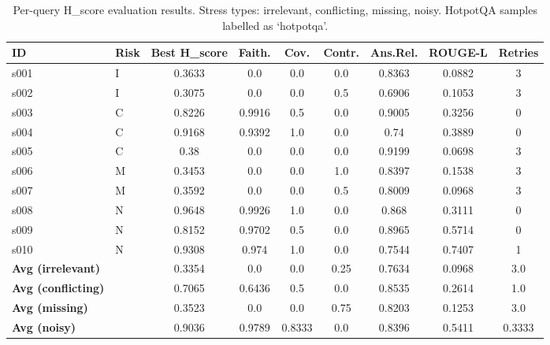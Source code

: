 \begin{table}[h]
\centering
\caption{Per-query H\_score evaluation results. Stress types: irrelevant, conflicting, missing, noisy. HotpotQA samples labelled as `hotpotqa'.}
\label{tab:hscore_results}
\begin{tabular}{llccccccc}
\hline
\textbf{ID} & \textbf{Risk} & \textbf{Best H\_score} & \textbf{Faith.} & \textbf{Cov.} & \textbf{Contr.} & \textbf{Ans.Rel.} & \textbf{ROUGE-L} & \textbf{Retries} \\
\hline
s001 & I & 0.3633 & 0.0 & 0.0 & 0.0 & 0.8363 & 0.0882 & 3 \\
s002 & I & 0.3075 & 0.0 & 0.0 & 0.5 & 0.6906 & 0.1053 & 3 \\
s003 & C & 0.8226 & 0.9916 & 0.5 & 0.0 & 0.9005 & 0.3256 & 0 \\
s004 & C & 0.9168 & 0.9392 & 1.0 & 0.0 & 0.74 & 0.3889 & 0 \\
s005 & C & 0.38 & 0.0 & 0.0 & 0.0 & 0.9199 & 0.0698 & 3 \\
s006 & M & 0.3453 & 0.0 & 0.0 & 1.0 & 0.8397 & 0.1538 & 3 \\
s007 & M & 0.3592 & 0.0 & 0.0 & 0.5 & 0.8009 & 0.0968 & 3 \\
s008 & N & 0.9648 & 0.9926 & 1.0 & 0.0 & 0.868 & 0.3111 & 0 \\
s009 & N & 0.8152 & 0.9702 & 0.5 & 0.0 & 0.8965 & 0.5714 & 0 \\
s010 & N & 0.9308 & 0.974 & 1.0 & 0.0 & 0.7544 & 0.7407 & 1 \\
\hline
\textbf{Avg (irrelevant)} & & 0.3354 & 0.0 & 0.0 & 0.25 & 0.7634 & 0.0968 & 3.0 \\
\textbf{Avg (conflicting)} & & 0.7065 & 0.6436 & 0.5 & 0.0 & 0.8535 & 0.2614 & 1.0 \\
\textbf{Avg (missing)} & & 0.3523 & 0.0 & 0.0 & 0.75 & 0.8203 & 0.1253 & 3.0 \\
\textbf{Avg (noisy)} & & 0.9036 & 0.9789 & 0.8333 & 0.0 & 0.8396 & 0.5411 & 0.3333 \\
\hline
\end{tabular}
\end{table}